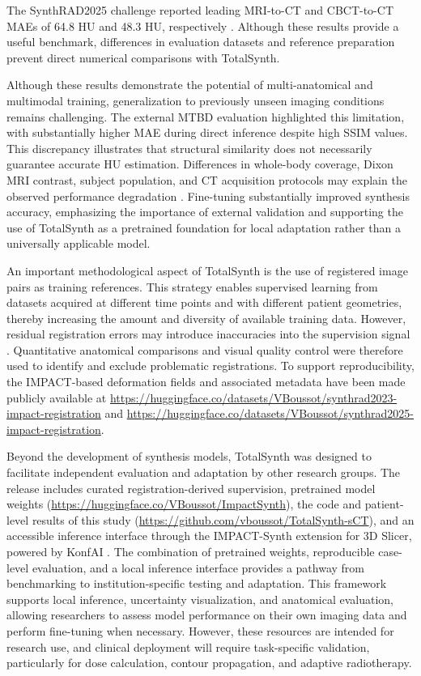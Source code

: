 \documentclass{article}
\begin{document}
The SynthRAD2025 challenge reported leading MRI-to-CT and CBCT-to-CT MAEs of 64.8 HU and 48.3 HU, respectively \cite{rogowski2026generating}. Although these results provide a useful benchmark, differences in evaluation datasets and reference preparation prevent direct numerical comparisons with TotalSynth.

Although these results demonstrate the potential of multi-anatomical and multimodal training, generalization to previously unseen imaging conditions remains challenging. The external MTBD evaluation highlighted this limitation, with substantially higher MAE during direct inference despite high SSIM values. This discrepancy illustrates that structural similarity does not necessarily guarantee accurate HU estimation. Differences in whole-body coverage, Dixon MRI contrast, subject population, and CT acquisition protocols may explain the observed performance degradation \cite{guan2021domain,guo2026impact}. Fine-tuning substantially improved synthesis accuracy, emphasizing the importance of external validation \cite{yu2022external} and supporting the use of TotalSynth as a pretrained foundation for local adaptation rather than a universally applicable model.

An important methodological aspect of TotalSynth is the use of registered image pairs as training references. This strategy enables supervised learning from datasets acquired at different time points and with different patient geometries, thereby increasing the amount and diversity of available training data. However, residual registration errors may introduce inaccuracies into the supervision signal \cite{boussot2026misalignment}. Quantitative anatomical comparisons and visual quality control were therefore used to identify and exclude problematic registrations. To support reproducibility, the IMPACT-based deformation fields and associated metadata have been made publicly available at \url{https://huggingface.co/datasets/VBoussot/synthrad2023-impact-registration} and \url{https://huggingface.co/datasets/VBoussot/synthrad2025-impact-registration}.


Beyond the development of synthesis models, TotalSynth was designed to facilitate independent evaluation and adaptation by other research groups. The release includes curated registration-derived supervision, pretrained model weights (\url{https://huggingface.co/VBoussot/ImpactSynth}), the code and patient-level results of this study (\url{https://github.com/vboussot/TotalSynth-sCT}), and an accessible inference interface through the IMPACT-Synth extension for 3D Slicer, powered by KonfAI \cite{boussot2025konfai}. 
The combination of pretrained weights, reproducible case-level evaluation, and a local inference interface provides a pathway from benchmarking to institution-specific testing and adaptation. This framework supports local inference, uncertainty visualization, and anatomical evaluation, allowing researchers to assess model performance on their own imaging data and perform fine-tuning when necessary. However, these resources are intended for research use, and clinical deployment will require task-specific validation, particularly for dose calculation, contour propagation, and adaptive radiotherapy.
\end{document}
